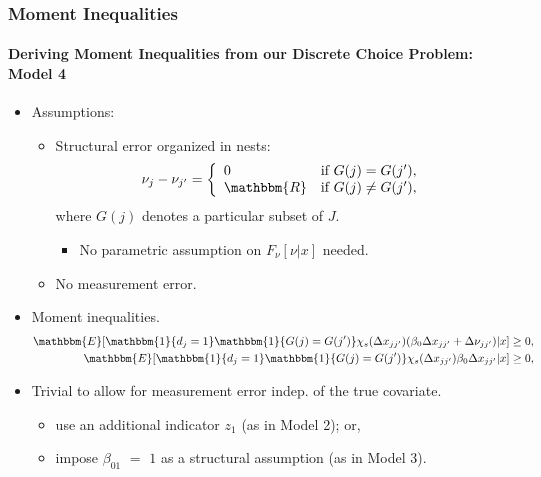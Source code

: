 \documentclass[10pt,letterpaper]{beamer}
\begin{document}
\begin{frame}
\frametitle{Moment Inequalities}
\framesubtitle{Deriving Moment Inequalities from our Discrete Choice Problem: Model 4}

\begin{itemize}
	\item Assumptions:
	\begin{itemize}
		\item Structural error organized in nests:
		\begin{equation*}
		\nu_{j} - \nu_{j'} = \left\{
		\begin{array}{ll}
		0 & \text{if $G(j)=G(j')$},\\
		\mathbbm{R} & \text{if $G(j)\neq G(j')$},\\
		\end{array} \right.
		\end{equation*}
		where $G(j)$ denotes a particular subset of $J$.\\
		\begin{itemize}
			\item No parametric assumption on $F_{\nu}[\nu|x]$ needed.
		\end{itemize}
		\item No measurement error.
	\end{itemize}
	\item Moment inequalities.
	\begin{align*}
	\mathbbm{E}[\mathbbm{1}\{d_{j}=1\}\mathbbm{1}\{G(j)=G(j')\}\chi_{s}(\Delta x_{jj'})(\beta_{0}\Delta x_{jj'}+\Delta\nu_{jj'})|x]\geq 0,\\
	\mathbbm{E}[\mathbbm{1}\{d_{j}=1\}\mathbbm{1}\{G(j)=G(j')\}\chi_{s}(\Delta x_{jj'}) \beta_{0}\Delta x_{jj'}|x]\geq 0,
	\end{align*}
	\item Trivial to allow for measurement error indep. of the true covariate. 
	\begin{itemize}
		\item use an additional indicator $z_{1}$ (as in Model 2); or,
		\item impose $\beta_{01}$ $=$ $1$ as a structural assumption (as in Model 3).
	\end{itemize}
\end{itemize}
\end{frame}
\end{document}

